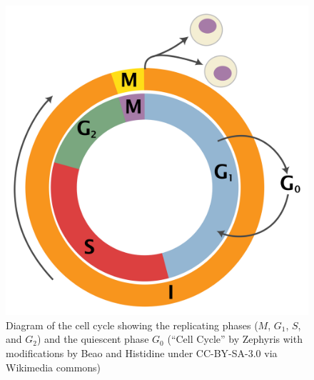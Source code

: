 \documentclass[
]{book}
\theoremstyle{definition}
\theoremstyle{definition}
\theoremstyle{definition}
\theoremstyle{remark}
\begin{document}
\begin{figure}
\centering
\includegraphics{ch10/2000px-Cell_Cycle.png}
\caption{Diagram of the cell cycle showing the replicating phases (\(M\), \(G_1\), \(S\), and \(G_2\)) and the quiescent phase \(G_0\) (``Cell Cycle'' by Zephyris with modifications by Beao and Histidine under CC-BY-SA-3.0 via Wikimedia commons)}
\end{figure}
\end{document}
